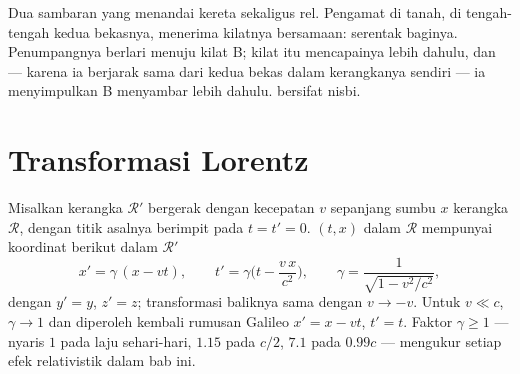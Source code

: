 \begin{omfigure}

{\small Dua sambaran yang menandai kereta sekaligus rel. Pengamat di
tanah, di tengah-tengah kedua bekasnya, menerima kilatnya bersamaan:
serentak baginya. Penumpangnya berlari menuju kilat B; kilat itu
mencapainya lebih dahulu, dan --- karena ia berjarak sama dari kedua
bekas dalam kerangkanya sendiri --- ia menyimpulkan B menyambar lebih
dahulu.  bersifat nisbi.}
\end{omfigure}

\section{Transformasi Lorentz}

\begin{theorem}\label{thm:b3:relativistic-kinematics:lorentz}
Misalkan kerangka $\mathcal R'$ bergerak dengan kecepatan $v$ sepanjang
sumbu $x$ kerangka $\mathcal R$, dengan titik asalnya berimpit pada
$t = t' = 0$.  $(t, x)$ dalam $\mathcal R$ mempunyai koordinat
berikut dalam $\mathcal R'$
\[
x' = \gamma\,(x - vt) , \qquad
t' = \gamma\Big(t - \frac{v\,x}{c^2}\Big) , \qquad
\gamma = \frac{1}{\sqrt{1 - v^2/c^2}} ,
\]
dengan $y' = y$, $z' = z$; transformasi baliknya sama dengan
$v \to -v$. Untuk $v \ll c$, $\gamma \to 1$ dan diperoleh kembali
rumusan Galileo $x' = x - vt$, $t' = t$. Faktor $\gamma \ge 1$ ---
nyaris $1$ pada laju sehari-hari, $1.15$ pada $c/2$, $7.1$ pada $0.99c$
--- mengukur setiap efek relativistik dalam bab ini.
\end{theorem}

